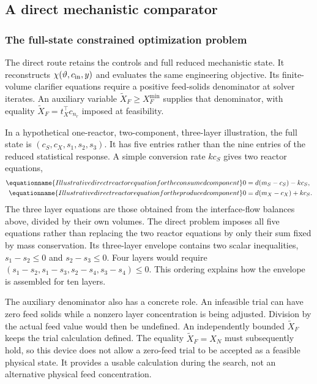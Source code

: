 \subsection{A direct mechanistic comparator}

\subsubsection{The full-state constrained optimization problem}

The direct route retains the controls and full reduced mechanistic state. It reconstructs $\chi(\vartheta,c_{\rm in},y)$ and evaluates the same engineering objective. Its finite-volume clarifier equations require a positive feed-solids denominator at solver iterates. An auxiliary variable $\widetilde X_F\ge X_F^{\min}$ supplies that denominator, with equality $\widetilde X_F=t_X^\top c_{n_r}$ imposed at feasibility.

In a hypothetical one-reactor, two-component, three-layer illustration, the full state is $(c_S,c_X,s_1,s_2,s_3)$. It has five entries rather than the nine entries of the reduced statistical response. A simple conversion rate $kc_S$ gives two reactor equations,
\begin{align}
\equationname{Illustrative direct reactor equation for the consumed component}
0&=d(m_S-c_S)-kc_S,\\
\equationname{Illustrative direct reactor equation for the produced component}
0&=d(m_X-c_X)+kc_S.
\end{align}
The three layer equations are those obtained from the interface-flow balances above, divided by their own volumes. The direct problem imposes all five equations rather than replacing the two reactor equations by only their sum fixed by mass conservation. Its three-layer envelope contains two scalar inequalities, $s_1-s_2\le0$ and $s_2-s_3\le0$. Four layers would require $(s_1-s_2,s_1-s_3,s_2-s_4,s_3-s_4)\le0$. This ordering explains how the envelope is assembled for ten layers.

The auxiliary denominator also has a concrete role. An infeasible trial can have zero feed solids while a nonzero layer concentration is being adjusted. Division by the actual feed value would then be undefined. An independently bounded $\widetilde X_F$ keeps the trial calculation defined. The equality $\widetilde X_F=X_N$ must subsequently hold, so this device does not allow a zero-feed trial to be accepted as a feasible physical state. It provides a usable calculation during the search, not an alternative physical feed concentration.

